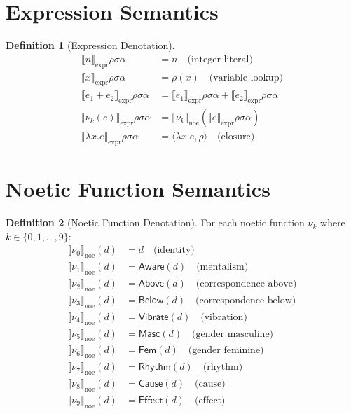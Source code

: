 \documentclass[11pt,twoside,openright]{book}
\theoremstyle{definition}
\newtheorem{definition}{Definition}[chapter]
\theoremstyle{plain}
\theoremstyle{remark}
\newcommand{\noe}[1]{\nu_{#1}}
\begin{document}
\section{Expression Semantics}

\begin{definition}[Expression Denotation]
\label{def:expr-denotation}
\begin{align}
\llbracket n \rrbracket_{\text{expr}} \rho \sigma \alpha &= n \quad \text{(integer literal)} \\
\llbracket x \rrbracket_{\text{expr}} \rho \sigma \alpha &= \rho(x) \quad \text{(variable lookup)} \\
\llbracket e_1 + e_2 \rrbracket_{\text{expr}} \rho \sigma \alpha &= \llbracket e_1 \rrbracket_{\text{expr}} \rho \sigma \alpha + \llbracket e_2 \rrbracket_{\text{expr}} \rho \sigma \alpha \\
\llbracket \noe{k}(e) \rrbracket_{\text{expr}} \rho \sigma \alpha &= \llbracket \noe{k} \rrbracket_{\text{noe}}(\llbracket e \rrbracket_{\text{expr}} \rho \sigma \alpha) \\
\llbracket \lambda x. e \rrbracket_{\text{expr}} \rho \sigma \alpha &= \langle \lambda x. e, \rho \rangle \quad \text{(closure)}
\end{align}
\end{definition}

\section{Noetic Function Semantics}

\begin{definition}[Noetic Function Denotation]
\label{def:noe-denotation}
For each noetic function $\noe{k}$ where $k \in \{0, 1, \ldots, 9\}$:
\begin{align}
\llbracket \noe{0} \rrbracket_{\text{noe}}(d) &= d \quad \text{(identity)} \\
\llbracket \noe{1} \rrbracket_{\text{noe}}(d) &= \mathsf{Aware}(d) \quad \text{(mentalism)} \\
\llbracket \noe{2} \rrbracket_{\text{noe}}(d) &= \mathsf{Above}(d) \quad \text{(correspondence above)} \\
\llbracket \noe{3} \rrbracket_{\text{noe}}(d) &= \mathsf{Below}(d) \quad \text{(correspondence below)} \\
\llbracket \noe{4} \rrbracket_{\text{noe}}(d) &= \mathsf{Vibrate}(d) \quad \text{(vibration)} \\
\llbracket \noe{5} \rrbracket_{\text{noe}}(d) &= \mathsf{Masc}(d) \quad \text{(gender masculine)} \\
\llbracket \noe{6} \rrbracket_{\text{noe}}(d) &= \mathsf{Fem}(d) \quad \text{(gender feminine)} \\
\llbracket \noe{7} \rrbracket_{\text{noe}}(d) &= \mathsf{Rhythm}(d) \quad \text{(rhythm)} \\
\llbracket \noe{8} \rrbracket_{\text{noe}}(d) &= \mathsf{Cause}(d) \quad \text{(cause)} \\
\llbracket \noe{9} \rrbracket_{\text{noe}}(d) &= \mathsf{Effect}(d) \quad \text{(effect)}
\end{align}
\end{definition}
\end{document}
